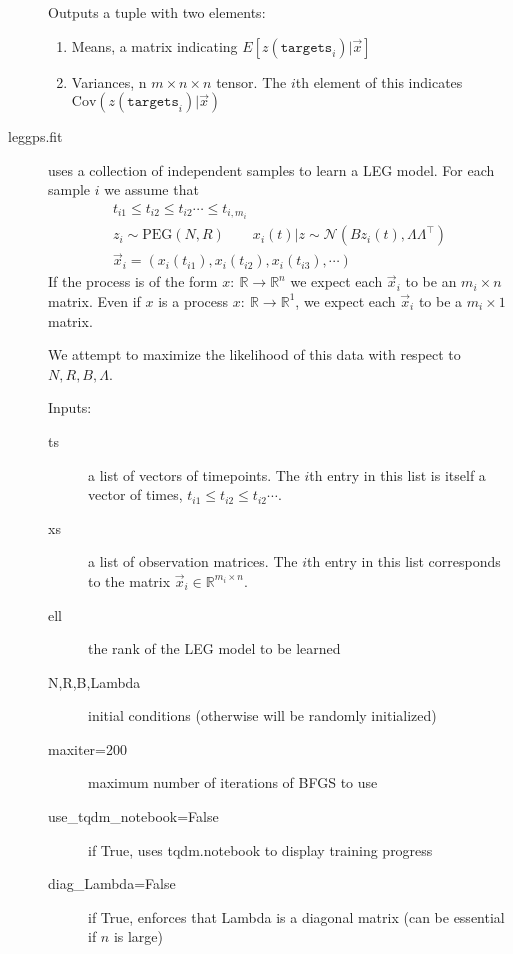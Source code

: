 \documentclass{article}
\theoremstyle{definition}
\newcommand{\PEGGP}{\mathrm{PEG}}
\newcommand{\Cov}{\mathrm{Cov}}
\begin{document}
\begin{description}
        Outputs a tuple with two elements:
        \begin{enumerate}
            \item Means, a matrix indicating $E[z(\mathtt{targets}_i)|\vec x]$
            \item Variances, n $m \times n \times n$ tensor.  The $i$th element of this indicates $\Cov(z(\mathtt{targets}_i)|\vec x)$
        \end{enumerate}

    \item[leggps.fit] uses a collection of independent samples to learn a LEG model.  For each sample $i$ we assume that
        \begin{gather*}
        t_{i1} \leq t_{i2} \leq t_{i2} \cdots \leq t_{i,m_i}\\    
        z_i \sim \PEGGP(N,R) \qquad x_i(t)|z \sim \mathcal{N}(Bz_i(t),\Lambda \Lambda^\top) \\
        \vec x_i = (x_{i}(t_{i1}),x_{i}(t_{i2}),x_{i}(t_{i3}),\cdots)
        \end{gather*}
        If the process is of the form $x:\ \mathbb{R} \rightarrow\mathbb{R}^n$ we expect each $\vec x_i$ to be an $m_i\times n$ matrix.  Even if $x$ is a process $x:\ \mathbb{R} \rightarrow\mathbb{R}^1$, we expect each $\vec x_i$ to be a $m_i \times 1$ matrix.  

        We attempt to maximize the likelihood of this data with respect to $N,R,B,\Lambda$.

        Inputs:
        \begin{description}
            \item[ts] a list of vectors of timepoints.  The $i$th entry in this list is itself a vector of times, $t_{i1} \leq t_{i2} \leq t_{i2} \cdots$.
            \item[xs] a list of observation matrices.  The $i$th entry in this list corresponds to the matrix $\vec x_i \in \mathbb{R}^{m_i \times n}$.  
            \item[ell]  the rank of the LEG model to be learned
            \item[N,R,B,Lambda] initial conditions (otherwise will be randomly initialized)
            \item[maxiter=200] maximum number of iterations of BFGS to use
            \item[use\_tqdm\_notebook=False] if True, uses tqdm.notebook to display training progress
            \item[diag\_Lambda=False] if True, enforces that Lambda is a diagonal matrix (can be essential if $n$ is large)
        \end{description}


\end{description}
\end{document}

